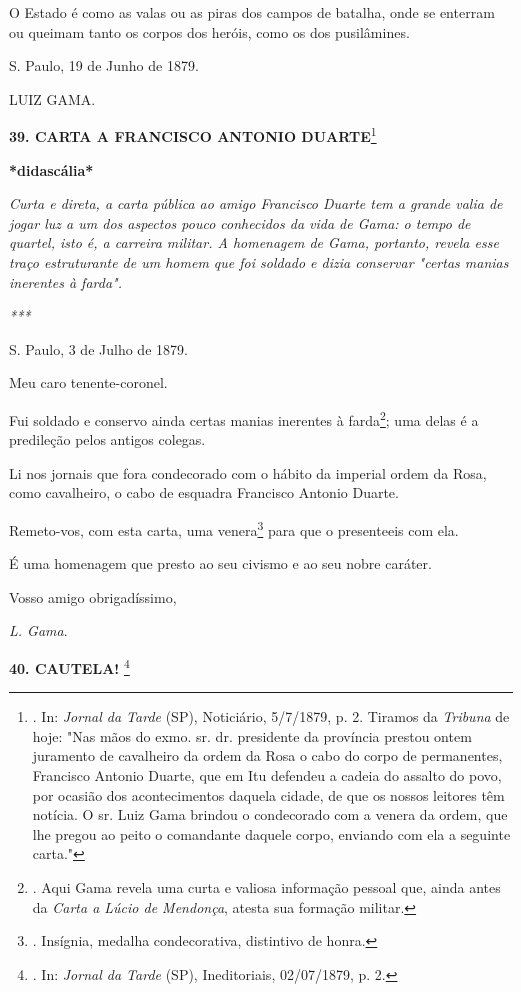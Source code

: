 O Estado é como as valas ou as piras dos campos de batalha, onde se
enterram ou queimam tanto os corpos dos heróis, como os dos pusilâmines.

S. Paulo, 19 de Junho de 1879.

LUIZ GAMA.

\textbf{39. CARTA A FRANCISCO ANTONIO DUARTE}\footnote{. In:
  \emph{Jornal da Tarde} (SP), Noticiário, 5/7/1879, p. 2. Tiramos da
  \emph{Tribuna} de hoje: "Nas mãos do exmo. sr. dr. presidente da
  província prestou ontem juramento de cavalheiro da ordem da Rosa o
  cabo do corpo de permanentes, Francisco Antonio Duarte, que em Itu
  defendeu a cadeia do assalto do povo, por ocasião dos acontecimentos
  daquela cidade, de que os nossos leitores têm notícia. O sr. Luiz Gama
  brindou o condecorado com a venera da ordem, que lhe pregou ao peito o
  comandante daquele corpo, enviando com ela a seguinte carta."}

\textbf{*didascália*}

\emph{Curta e direta, a carta pública ao amigo Francisco Duarte tem a
grande valia de jogar luz a um dos aspectos pouco conhecidos da vida de
Gama: o tempo de quartel, isto é, a carreira militar. A homenagem de
Gama, portanto, revela esse traço estruturante de um homem que foi
soldado e dizia conservar "certas manias inerentes à farda". }

\emph{***}

S. Paulo, 3 de Julho de 1879.

Meu caro tenente-coronel.

Fui soldado e conservo ainda certas manias inerentes à farda\footnote{.
  Aqui Gama revela uma curta e valiosa informação pessoal que, ainda
  antes da \emph{Carta a Lúcio de Mendonça}, atesta sua formação
  militar.}; uma delas é a predileção pelos antigos colegas.

Li nos jornais que fora condecorado com o hábito da imperial ordem da
Rosa, como cavalheiro, o cabo de esquadra Francisco Antonio Duarte.

Remeto-vos, com esta carta, uma venera\footnote{. Insígnia, medalha
  condecorativa, distintivo de honra.}
par\protect\hypertarget{Secao_Sem_Titulo-52}{}{}a que o presenteeis com
ela.

É uma homenagem que presto ao seu civismo e ao seu nobre caráter.

Vosso amigo obrigadíssimo,

\emph{L. Gama}.

\textbf{40. CAUTELA!} \footnote{. In: \emph{Jornal da Tarde} (SP),
  Ineditoriais, 02/07/1879, p. 2.}

